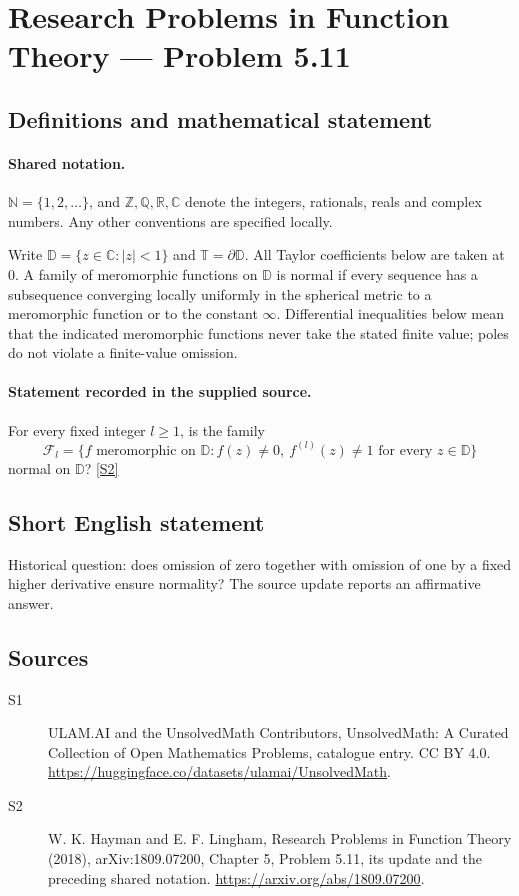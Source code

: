 \documentclass[11pt]{article}
\newcommand{\sref}[2]{\hyperlink{source:#1:#2}{[S#2]}}
\begin{document}
\section{Research Problems in Function Theory — Problem 5.11}\label{statement}

\subsection{Definitions and mathematical statement}

\paragraph{Shared notation.}$\mathbb N=\{1,2,\ldots\}$, and $\mathbb Z,\mathbb Q,\mathbb R,\mathbb C$ denote the integers, rationals, reals and complex numbers. Any other conventions are specified locally.


Write $\mathbb D=\{z\in\mathbb C:|z|<1\}$ and $\mathbb T=\partial\mathbb D$. All Taylor coefficients below are taken at $0$. A family of meromorphic functions on $\mathbb D$ is normal if every sequence has a subsequence converging locally uniformly in the spherical metric to a meromorphic function or to the constant $\infty$. Differential inequalities below mean that the indicated meromorphic functions never take the stated finite value; poles do not violate a finite-value omission.
\paragraph{Statement recorded in the supplied source.}
For every fixed integer $l\ge1$, is the family
\[\mathcal F_l=\{f\text{ meromorphic on }\mathbb D:f(z)\ne0,\ f^{(l)}(z)\ne1\text{ for every }z\in\mathbb D\}\]
normal on $\mathbb D$? \sref{statement}{2}
\subsection{Short English statement}
Historical question: does omission of zero together with omission of one by a fixed higher derivative ensure normality? The source update reports an affirmative answer.
\subsection{Sources}
\begin{description}
\item[\hypertarget{source:statement:1}{S1}] ULAM.AI and the UnsolvedMath Contributors, UnsolvedMath: A Curated Collection of Open Mathematics Problems, catalogue entry. CC BY 4.0. \url{https://huggingface.co/datasets/ulamai/UnsolvedMath}.
\item[\hypertarget{source:statement:2}{S2}] W. K. Hayman and E. F. Lingham, Research Problems in Function Theory (2018), arXiv:1809.07200, Chapter 5, Problem 5.11, its update and the preceding shared notation. \url{https://arxiv.org/abs/1809.07200}.
\end{description}
\label{end:statement}
\end{document}
